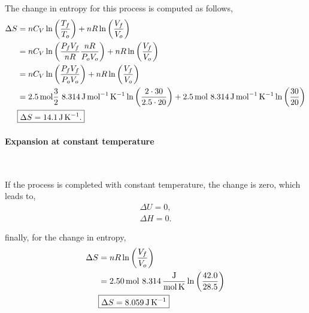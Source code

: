 \documentclass[main.tex]{subfiles}
\begin{document}
The change in entropy for this process is computed as follows,
\begin{align*}
    \Delta S &= n C_V\ln\qty(\frac{T_f}{T_o}) + n R \ln\qty(\frac{V_f}{V_o}) \\ 
    &= n C_V\ln\qty(\frac{P_fV_f}{nR}\frac{nR}{P_oV_o}) + n R \ln\qty(\frac{V_f}{V_o}) \\
    &= n C_V\ln\qty(\frac{P_fV_f}{P_oV_o}) + n R \ln\qty(\frac{V_f}{V_o}) \\ 
    &= \SI{2.5}{mol}\frac{3}{2}~\SI{8.314}{\joule\per\mole\per\kelvin}\ln\qty(\frac{2\cdot30}{2.5\cdot20}) + \SI{2.5}{mol}~\SI{8.314}{\joule\per\mole\per\kelvin}\ln\qty(\frac{30}{20}) \\
    &\begin{gathered}
        \boxed{\Delta S = \SI{14.1}{\joule\per\kelvin}.}
    \end{gathered}
\end{align*}


\paragraph{Expansion at constant temperature}~

If the process is completed with constant temperature, the change is zero, which leads to,
\begin{gather*}
    \boxed{\Delta U = 0,} \\
    \boxed{\Delta H  = 0.}
\end{gather*}

finally, for the change in entropy,
\begin{align*}
    \Delta S &= nR\ln\qty(\frac{V_f}{V_o}) \\ 
    &= \SI{2.50}{\mol}~\SI[per-mode=fraction]{8.314}{\joule\per\mole\per\kelvin}\ln\qty(\frac{42.0}{28.5}) \\
    &\begin{gathered}
        \boxed{\Delta S = \SI{8.059}{\joule\per\kelvin}}
    \end{gathered}
\end{align*}


\end{document}
